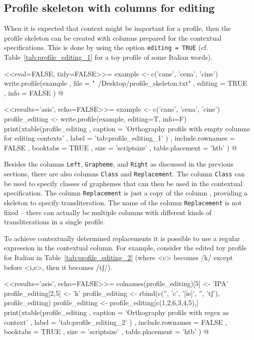 \subsection*{Profile skeleton with columns for editing}
\label{profile-editing}

When it is expected that context might be important for a profile, then the
profile skeleton can be created with columns prepared for the contextual
specifications. This is done by using the option \texttt{editing = TRUE} (cf.
Table~\ref{tab:profile_editing_1} for a toy profile of some Italian words).

<<eval=FALSE, tidy=FALSE>>=
example <- c('cane', 'cena', 'cine')
write.profile(example
              , file = "~/Desktop/profile_skeleton.txt"
              , editing = TRUE
              , info = FALSE
              )
@

<<results='asis', echo=FALSE>>=
example <- c('cane', 'cena', 'cine')
profile_editing <- write.profile(example, editing=T, info=F)
print(xtable(profile_editing
        , caption = 'Orthography profile with empty columns for editing contexts'
        , label = 'tab:profile_editing_1'
        )
  , include.rownames = FALSE
  , booktabs = TRUE
  , size = 'scriptsize'
  , table.placement = 'htb'
  )
@

Besides the columns \texttt{Left}, \texttt{Grapheme}, and \texttt{Right} as
discussed in the previous sections, there are also columns \texttt{Class} and
\texttt{Replacement}. The column \texttt{Class} can be used to specify classes
of graphemes that can then be used in the contextual specification. The column
\texttt{Replacement} is just a copy of the column , providing a
skeleton to specify transliteration. The name of the column
\texttt{Replacement} is not fixed -- there can actually be multiple columns with 
different kinds of transliterations in a single profile.

To achieve contextually determined replacements it is possible to use a regular
expression in the contextual column. For example, consider the edited toy
profile for Italian in Table~\ref{tab:profile_editing_2} (where <c> becomes /k/
except before <i,e>, then it becomes /tʃ/). 

<<results='asis', echo=FALSE>>=
colnames(profile_editing)[5] <- 'IPA'
profile_editing[2,5] <- 'k'
profile_editing <- rbind(c('', 'c', '[ie]', '', 'tʃ'), profile_editing)
profile_editing <- profile_editing[c(1,2,6,3,4,5),]
print(xtable(profile_editing
        , caption = 'Orthography profile with regex as context'
        , label = 'tab:profile_editing_2'
        )
  , include.rownames = FALSE
  , booktabs = TRUE
  , size = 'scriptsize'
  , table.placement = 'htb'
  )
@

